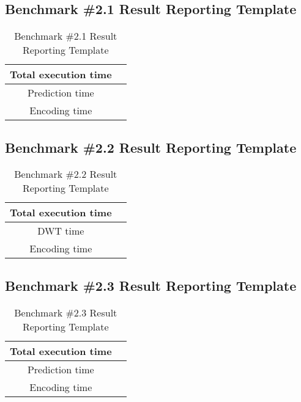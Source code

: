 \newpage
\subsection{Benchmark \#2.1 Result Reporting Template}



\begin{table}[!h]
    \centering
    \begin{tabular}{|c|c|}
        \hline
        Total execution time & \\ \hline
        Prediction time & \\ \hline
        Encoding time & \\ \hline
    \end{tabular}
    \caption{Benchmark \#2.1 Result Reporting Template}
    \label{tab:bm2_1_report_template}
\end{table}

\subsection{Benchmark \#2.2 Result Reporting Template}

\begin{table}[!h]
    \centering
    \begin{tabular}{|c|c|}
        \hline
        Total execution time & \\ \hline
        DWT time & \\ \hline
        Encoding time & \\ \hline
    \end{tabular}
    \caption{Benchmark \#2.2 Result Reporting Template}
    \label{tab:bm2_2_report_template}
\end{table}

\subsection{Benchmark \#2.3 Result Reporting Template}

\begin{table}[!h]
    \centering
    \begin{tabular}{|c|c|}
        \hline
        Total execution time & \\ \hline
        Prediction time & \\ \hline
        Encoding time & \\ \hline
    \end{tabular}
    \caption{Benchmark \#2.3 Result Reporting Template}
    \label{tab:bm2_3_report_template}
\end{table}

